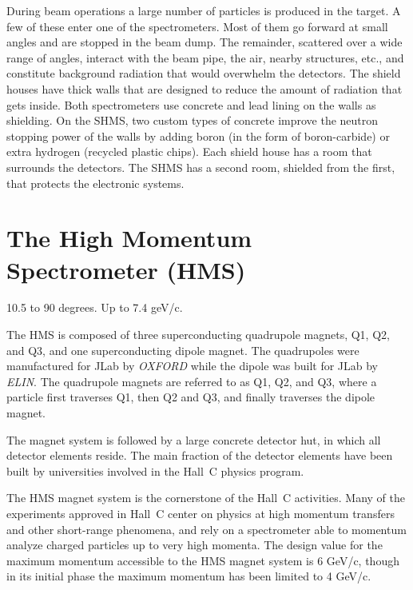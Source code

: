 {During beam operations a large number of particles is
produced in the target. A few of these enter one of the spectrometers. Most of 
them go forward at small angles and are stopped in the beam dump. The
remainder, scattered over a wide range of angles,  interact with the beam pipe, 
the air, nearby structures, etc., and
constitute background radiation that would overwhelm the detectors.
The shield houses have thick walls that are designed to reduce the amount of
radiation that gets inside. Both spectrometers use
concrete and lead lining on the walls as shielding. On
the SHMS, two custom types of concrete improve the neutron stopping power 
of the walls by
adding boron (in the form of boron-carbide) or extra hydrogen (recycled
plastic chips). Each shield house has a room that surrounds the detectors.
The SHMS has a second room, shielded from the first, that protects the
electronic systems.


\section{The High Momentum Spectrometer (HMS) }

10.5 to 90 degrees.  Up to 7.4 geV/c.  

The HMS is composed of three superconducting quadrupole magnets,
Q1, Q2, and Q3, and one superconducting dipole magnet. The quadrupoles
were manufactured for JLab by {\em OXFORD} while the dipole was built for 
JLab by {\em ELIN}.
The quadrupole magnets are referred to as Q1, Q2, and Q3, where a particle first traverses 
Q1, then Q2 and Q3, and finally traverses the dipole magnet.

The magnet system is followed by a large concrete detector hut, in which all
detector elements reside. The main fraction of the detector elements have been
built by universities involved in the Hall~C physics program.

The HMS magnet system is the cornerstone of the Hall~C activities.
Many of the experiments approved in Hall~C center on physics at high
momentum transfers and other short-range phenomena, and rely on a spectrometer
able to momentum analyze charged particles up to very high momenta.
The design value for the maximum momentum accessible to the HMS magnet
system is 6 GeV/c, though in its initial phase the maximum momentum
has been limited to 4 GeV/c.


}
